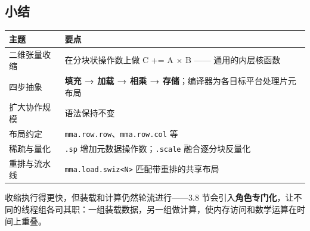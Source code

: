 \subsection*{小结}

\begin{table}[htbp]\centering\small
\begin{tabularx}{\linewidth}{@{}lX@{}}
\toprule
\textbf{主题} & \textbf{要点} \\
\midrule
二维张量收缩 & 在分块状操作数上做 C += A × B —— 通用的内层核函数 \\
四步抽象 & \textbf{填充 → 加载 → 相乘 → 存储}；编译器为各目标平台处理片元布局 \\
扩大协作规模 & 语法保持不变 \\
布局约定 & \texttt{mma.row.row}、\texttt{mma.row.col} 等 \\
稀疏与量化 & \texttt{.sp} 增加元数据操作数；\texttt{.scale} 融合逐分块反量化 \\
重排与流水线 & \texttt{mma.load.swiz\textless{}N\textgreater{}} 匹配带重排的共享布局 \\
\bottomrule
\end{tabularx}
\end{table}

收缩执行得更快，但装载和计算仍然轮流进行——3.8 节会引入\textbf{角色专门化}，让不同的线程组各司其职：一组装载数据，另一组做计算，使内存访问和数学运算在时间上重叠。
